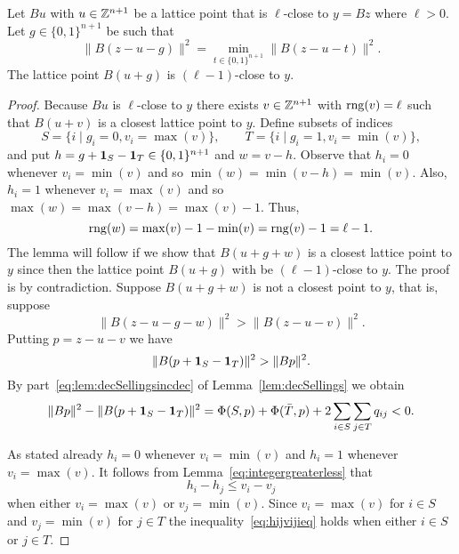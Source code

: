\documentclass[final,leqno]{siamltex}
\begin{document}
\begin{lemma}\label{lem:rngdecreases}
Let $Bu$ with $u \in {\mathbb Z}^{n+1}$ be a lattice point that is $\ell$-close to $y = Bz$ where $\ell > 0$.  Let $g \in \{0,1\}^{n+1}$ be such that
\begin{equation}\label{eq:qismin}
\|B(z - u - g)\|^2 = \min_{t \in \{0,1\}^{n+1}}\|B(z - u - t)\|^2.
\end{equation}
The lattice point $B(u+g)$ is $(\ell-1)$-close to $y$.
\end{lemma}
\begin{proof}
Because $Bu$ is $\ell$-close to $y$ there exists $v \in {\mathbb Z}^{n+1}$ with $\operatorname{rng}(v) = \ell$ such that $B(u+v)$ is a closest lattice point to $y$.  Define subsets of indices
\[
S = \{i \mid g_i = 0, v_i = \max(v) \}, \qquad T = \{i \mid g_i = 1, v_i = \min(v) \}, 
\]
and put $h = g + \boldsymbol{1}_S - \boldsymbol{1}_T \in \{0,1\}^{n+1}$ and $w = v - h$.  Observe that $h_i = 0$ whenever $v_i = \min(v)$ and so $\min(w) = \min(v-h) = \min(v)$.  Also, $h_i = 1$ whenever $v_i = \max(v)$ and so $\max(w) = \max(v-h) = \max(v) - 1$.  Thus,
\[
\operatorname{rng}(w) = \max(v) - 1 - \min(v) = \operatorname{rng}(v) - 1 = \ell - 1.
\]
The lemma will follow if we show that $B(u+g+w)$ is a closest lattice point to $y$ since then the lattice point $B(u+g)$ with be $(\ell-1)$-close to $y$.  The proof is by contradiction.  Suppose $B(u+g+w)$ is not a closest point to $y$, that is, suppose
\[
\|B(z-u-g-w)\|^2 > \|B(z-u-v)\|^2.
\]
Putting $p = z-u-v$ we have
\[
\|B(p+\boldsymbol{1}_S-\boldsymbol{1}_T)\|^2 > \|Bp\|^2.
\]
By part~\ref{eq:lem:decSellingsincdec} of Lemma~\ref{lem:decSellings} we obtain
\begin{equation}\label{eq:BpBpdecincineq}
\|Bp\|^2 - \|B(p+\onebf_S-\onebf_T)\|^2 = \Phi(S,p) + \Phi(\bar{T}, p) + 2\sum_{i\in S}\sum_{j \in T} q_{ij} < 0.
\end{equation}

As stated already $h_i = 0$ whenever $v_i = \min(v)$ and $h_i = 1$ whenever $v_i = \max(v)$.  It follows from Lemma~\ref{eq:integergreaterless} that
\begin{equation}\label{eq:hijvijieq}
h_{i} - h_j \leq v_{i} - v_j
\end{equation}
when either $v_i = \max(v)$ or $v_j = \min(v)$.  Since $v_i = \max(v)$ for $i \in S$ and $v_j = \min(v)$ for $j \in T$ the inequality~\eqref{eq:hijvijieq} holds when either $i \in S$ or $j \in T$.


\end{proof}
\end{document}
